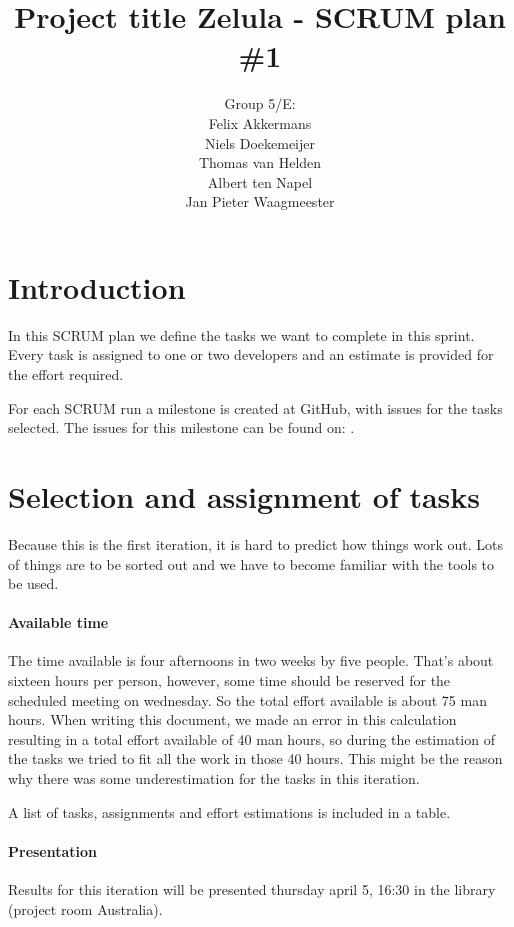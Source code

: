 \documentclass[a4paper]{article}
\title{Project title Zelula - SCRUM plan \#1}
\author{Group 5/E:\\
Felix Akkermans \\
Niels Doekemeijer \\
Thomas van Helden \\
Albert ten Napel \\
Jan Pieter Waagmeester}
\begin{document}
\maketitle

\section{Introduction}
In this SCRUM plan we define the tasks we want to complete in this sprint. Every task is assigned to one or two developers and an estimate is provided for the effort required.

For each SCRUM run a milestone is created at GitHub, with issues for the tasks selected. The issues for this milestone can be found on: .

\section{Selection and assignment of tasks}
Because this is the first iteration, it is hard to predict how things work out. Lots of things are to be sorted out and we have to become familiar with the tools to be used.

\paragraph{Available time}
The time available is four afternoons in two weeks by five people. That's about sixteen hours per person, however, some time should be reserved for the scheduled meeting on wednesday. So the total effort available is about 75 man hours. When writing this document, we made an error in this calculation resulting in a total effort available of 40 man hours, so during the estimation of the tasks we tried to fit all the work in those 40 hours. This might be the reason why there was some underestimation for the tasks in this iteration.

A list of tasks, assignments and effort estimations is included in a table.


\paragraph{Presentation}
Results for this iteration will be presented thursday april 5, 16:30 in the library (project room Australia).
\end{document}
